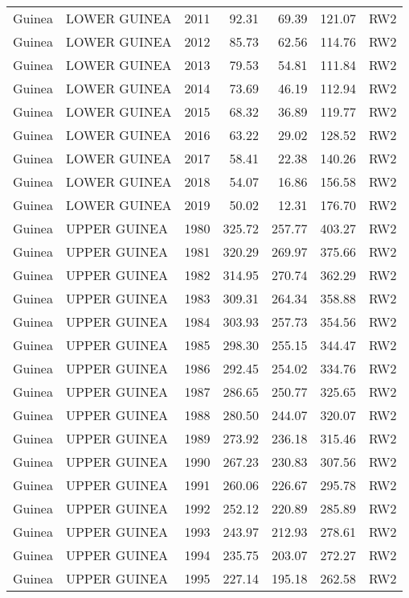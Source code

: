 \begin{longtable}{lllrrrl}
  Guinea & LOWER GUINEA & 2011 & 92.31 & 69.39 & 121.07 & RW2 \\ 
  Guinea & LOWER GUINEA & 2012 & 85.73 & 62.56 & 114.76 & RW2 \\ 
  Guinea & LOWER GUINEA & 2013 & 79.53 & 54.81 & 111.84 & RW2 \\ 
  Guinea & LOWER GUINEA & 2014 & 73.69 & 46.19 & 112.94 & RW2 \\ 
  Guinea & LOWER GUINEA & 2015 & 68.32 & 36.89 & 119.77 & RW2 \\ 
  Guinea & LOWER GUINEA & 2016 & 63.22 & 29.02 & 128.52 & RW2 \\ 
  Guinea & LOWER GUINEA & 2017 & 58.41 & 22.38 & 140.26 & RW2 \\ 
  Guinea & LOWER GUINEA & 2018 & 54.07 & 16.86 & 156.58 & RW2 \\ 
  Guinea & LOWER GUINEA & 2019 & 50.02 & 12.31 & 176.70 & RW2 \\ 
  Guinea & UPPER GUINEA & 1980 & 325.72 & 257.77 & 403.27 & RW2 \\ 
  Guinea & UPPER GUINEA & 1981 & 320.29 & 269.97 & 375.66 & RW2 \\ 
  Guinea & UPPER GUINEA & 1982 & 314.95 & 270.74 & 362.29 & RW2 \\ 
  Guinea & UPPER GUINEA & 1983 & 309.31 & 264.34 & 358.88 & RW2 \\ 
  Guinea & UPPER GUINEA & 1984 & 303.93 & 257.73 & 354.56 & RW2 \\ 
  Guinea & UPPER GUINEA & 1985 & 298.30 & 255.15 & 344.47 & RW2 \\ 
  Guinea & UPPER GUINEA & 1986 & 292.45 & 254.02 & 334.76 & RW2 \\ 
  Guinea & UPPER GUINEA & 1987 & 286.65 & 250.77 & 325.65 & RW2 \\ 
  Guinea & UPPER GUINEA & 1988 & 280.50 & 244.07 & 320.07 & RW2 \\ 
  Guinea & UPPER GUINEA & 1989 & 273.92 & 236.18 & 315.46 & RW2 \\ 
  Guinea & UPPER GUINEA & 1990 & 267.23 & 230.83 & 307.56 & RW2 \\ 
  Guinea & UPPER GUINEA & 1991 & 260.06 & 226.67 & 295.78 & RW2 \\ 
  Guinea & UPPER GUINEA & 1992 & 252.12 & 220.89 & 285.89 & RW2 \\ 
  Guinea & UPPER GUINEA & 1993 & 243.97 & 212.93 & 278.61 & RW2 \\ 
  Guinea & UPPER GUINEA & 1994 & 235.75 & 203.07 & 272.27 & RW2 \\ 
  Guinea & UPPER GUINEA & 1995 & 227.14 & 195.18 & 262.58 & RW2 \\ 

\end{longtable}
